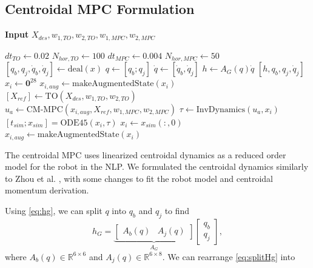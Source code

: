 \documentclass[conference]{IEEEtran}
\begin{document}
\subsection{Centroidal MPC Formulation} \label{MPC}

\begin{algorithm}[ht]
    \caption{Main To, Simulation, and Control Process}
    \label{alg:main}
    \hspace{\algorithmicindent} \textbf{Input} $X_{des}, w_{1, TO}, w_{2, TO}, w_{1, MPC}, w_{2, MPC}$
    \begin{algorithmic}
        \State $dt_{TO} \gets 0.02$
        \State $N_{hor, TO} \gets 100$
        \State  $dt_{MPC} \gets 0.004$
        \State  $N_{hor, MPC} \gets 50$
            \State $\left[q_b, q_j, \dot{q}_b, \dot{q}_j \right] \gets \text{deal}(x)$
            \State $q \gets \left[q_b; q_j\right]$
            \State $\dot{q} \gets \left[\dot{q}_b, \dot{q}_j\right]$ 
            \State $h \gets A_G(q) \dot{q}$
            \Return $\left[h, q_b, q_j,  \dot{q}_j \right]$
        \EndFunction
        \State $x_i \gets \mathbf{0}^{28}$
        \State $x_{i, aug} \gets \text{makeAugmentedState}(x_i)$
        \State $\left[X_{ref}\right] \gets \text{TO}(X_{des}, w_{1, TO}, w_{2, TO})$
            \State $u_a \gets \text{CM-MPC}(x_{i, aug}, X_{ref}, w_{1, MPC}, w_{2, MPC})$
            \State $\tau \gets \text{InvDynamics}(u_a, x_i)$
            \State $\left[t_{sim}; x_{sim}\right] = \text{ODE45}(x_i, \tau)$
            \State $x_i \gets x_{sim}(:, 0)$
            \State $x_{i, aug} \gets \text{makeAugmentedState}(x_i)$
        \EndFor
    \end{algorithmic}
\end{algorithm}

The centroidal MPC uses linearized centroidal dynamics as a reduced order model for the robot in the NLP. We formulated the centroidal dynamics similarly to Zhou et al. \cite{zhou2022momentum}, with some changes to fit the robot model and centroidal momentum derivation.

Using \eqref{eq:hg}, we can split $q$ into $q_b$ and $q_j$ to find
\begin{equation}
    h_G = \underbrace{\begin{bmatrix}
        A_b(q) & A_j(q)
    \end{bmatrix}}_{A_G} \begin{bmatrix}
        q_b \\ q_j
    \end{bmatrix},
    \label{eq:splitHg}
\end{equation}
where $A_b(q) \in \mathbb{R}^{6\times 6}$ and $A_j(q) \in \mathbb{R}^{6\times 8}$. We can rearrange \eqref{eq:splitHg} into
\end{document}
